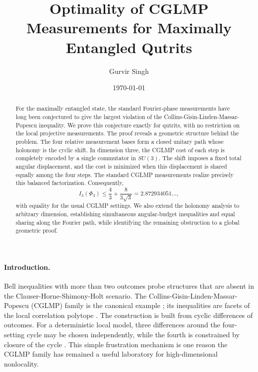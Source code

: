 \documentclass[aps,prl,reprint,superscriptaddress,nofootinbib]{revtex4-2}
\begin{document}
\title{Optimality of CGLMP Measurements for Maximally Entangled Qutrits}

\author{Gurvir Singh}

\date{\today}

\begin{abstract}
For the maximally entangled state, the standard Fourier-phase measurements have long been conjectured to give the largest violation of the Collins-Gisin-Linden-Massar-Popescu inequality. We prove this conjecture exactly for qutrits, with no restriction on the local projective measurements. The proof reveals a geometric structure behind the problem. The four relative measurement bases form a closed unitary path whose holonomy is the cyclic shift. In dimension three, the CGLMP cost of each step is completely encoded by a single commutator in $SU(3)$. The shift imposes a fixed total angular displacement, and the cost is minimized when this displacement is shared equally among the four steps. The standard CGLMP measurements realize precisely this balanced factorization. Consequently,
\[
I_3(\Phi_3)\leq \frac{4}{3}+\frac{8}{3\sqrt3}=2.872934051\ldots,
\]
with equality for the usual CGLMP settings. We also extend the holonomy analysis to arbitrary dimension, establishing simultaneous angular-budget inequalities and equal sharing along the Fourier path, while identifying the remaining obstruction to a global geometric proof.
\end{abstract}

\maketitle

\paragraph{Introduction.}
Bell inequalities with more than two outcomes probe structures that are absent in the Clauser-Horne-Shimony-Holt scenario. The Collins-Gisin-Linden-Massar-Popescu (CGLMP) family is the canonical example \cite{CGLMP}; its inequalities are facets of the local correlation polytope \cite{Masanes}. The construction is built from cyclic differences of outcomes. For a deterministic local model, three differences around the four-setting cycle may be chosen independently, while the fourth is constrained by closure of the cycle \cite{CGLMP}. This simple frustration mechanism is one reason the CGLMP family has remained a useful laboratory for high-dimensional nonlocality.
\end{document}
